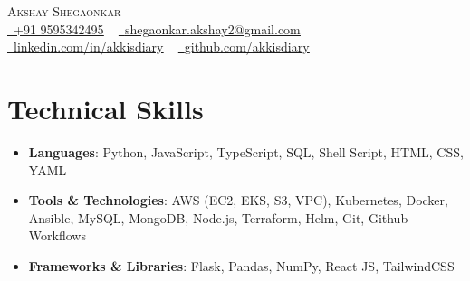 \documentclass[letterpaper,11pt]{article}
\newcommand{\resumeItem}[1]{
    \item\small{
        {#1}
    }
}
\newcommand{\resumeItemListStart}{\begin{itemize}}
\newcommand{\resumeItemListEnd}{\end{itemize}}
\begin{document}
\begin{center}
    {\Huge\scshape Akshay Shegaonkar} \\ \vspace{1pt}
    \href{tel:+919595342495}{\raisebox{-0.2\height}\faPhone\ \underline{+91 9595342495}} ~
    \href{mailto:shegaonkar.akshay2@gmail.com}{\raisebox{-0.2\height}\faEnvelope\  \underline{shegaonkar.akshay2@gmail.com}} ~
    \href{https://www.linkedin.com/in/akkisdiary/}{\raisebox{-0.2\height}\faLinkedin\ \underline{linkedin.com/in/akkisdiary}} ~
    \href{https://github.com/akkisdiary}{\raisebox{-0.2\height}\faGithub\ \underline{github.com/akkisdiary}}
\end{center}

\section{Technical Skills}
\resumeItemListStart
    \resumeItem
    {\textbf{Languages}: Python, JavaScript, TypeScript, SQL, Shell Script, HTML, CSS, YAML}
    \resumeItem
    {\textbf{Tools \& Technologies}: AWS (EC2, EKS, S3, VPC), Kubernetes, Docker, Ansible, MySQL, MongoDB, Node.js, Terraform, Helm, Git, Github Workflows}
    \resumeItem
    {\textbf{Frameworks \& Libraries}: Flask, Pandas, NumPy, React JS, TailwindCSS}
\resumeItemListEnd


\end{document}
